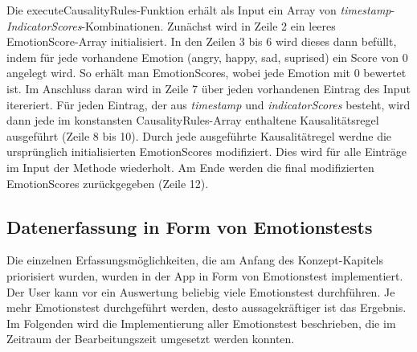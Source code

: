 Die executeCausalityRules-Funktion erhält als Input ein Array von \textit{timestamp}-\textit{IndicatorScores}-Kombinationen. Zunächst wird in Zeile 2 ein leeres EmotionScore-Array initialisiert. In den Zeilen 3 bis 6 wird dieses dann befüllt, indem für jede vorhandene Emotion (angry, happy, sad, suprised) ein Score von 0 angelegt wird. So erhält man EmotionScores, wobei jede Emotion mit 0 bewertet ist. \newline
Im Anschluss daran wird in Zeile 7 über jeden vorhandenen Eintrag des Input itereriert. Für jeden Eintrag, der aus \textit{timestamp} und \textit{indicatorScores} besteht, wird dann jede im konstansten CausalityRules-Array enthaltene Kausalitätsregel ausgeführt (Zeile 8 bis 10). Durch jede ausgeführte Kausalitätregel werdne die ursprünglich initialisierten EmotionScores modifiziert. Dies wird für alle Einträge im Input der Methode wiederholt. Am Ende werden die final modifizierten EmotionScores zurückgegeben (Zeile 12). 
\subsection{Datenerfassung in Form von Emotionstests}
Die einzelnen Erfassungsmöglichkeiten, die am Anfang des Konzept-Kapitels priorisiert wurden, wurden in der App in Form von Emotionstest implementiert. Der User kann vor ein Auswertung beliebig viele Emotionstest durchführen. Je mehr Emotionstest durchgeführt werden, desto aussagekräftiger ist das Ergebnis. Im Folgenden wird die Implementierung aller Emotionstest beschrieben, die im Zeitraum der Bearbeitungszeit umgesetzt werden konnten.
